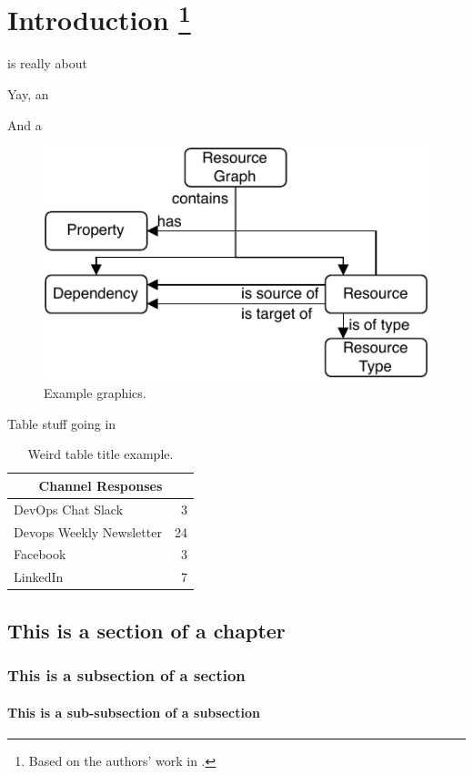 
\chapter[%
    Introduction%
]{%
    Introduction%
    \footnote{
      Based on the authors' work in \cite{Sokolowski2024Automated,Sokolowski2024Pipr}.
    }
}
\label{sec:intro}

 is really about \lipsum[2]

Yay, an  \lipsum[5]

And a  \lipsum[6]

\begin{figure}
  \includegraphics[width=.5\linewidth]{graphics/example.pdf}
  \caption{Example graphics.}
  \label{fig:example}
\end{figure}

Table stuff going in  \lipsum[6]
\begin{table}
	\caption{Weird table title example.} 
	\label{tab:example}
	\begin{tabular}{lr}
		\toprule
		\multicolumn{2}{c}{Channel \hspace{2cm} Responses} \\ 
		\midrule
		DevOps Chat Slack & 3 \\ 
		Devops Weekly Newsletter & 24  \\ 
		Facebook & 3 \\ 
		LinkedIn & 7 \\ 
		\bottomrule
	\end{tabular}
\end{table}


\section{This is a section of a chapter}
\label{sec:intro:section}

\lipsum[7]

\subsection{This is a subsection of a section}
\label{sec:intro:subsection}

\lipsum[8]

\subsubsection{This is a sub-subsection of a subsection}
\label{sec:intro:subsubsection}

\lipsum[9]
